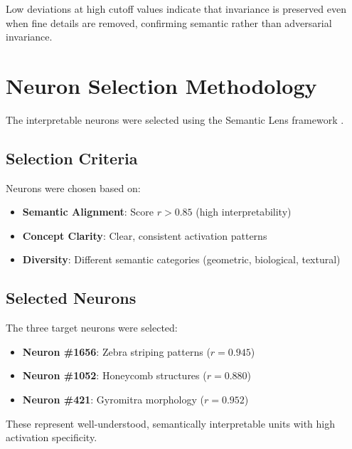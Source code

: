 \documentclass[licencjacka,en]{pracamgr}
\begin{document}
Low deviations at high cutoff values indicate that invariance is preserved even when fine details are removed, confirming semantic rather than adversarial invariance.

\section{Neuron Selection Methodology}\label{appendix:neuron_selection}

The interpretable neurons were selected using the Semantic Lens framework \citep{dreyer2025mechanisticunderstandingvalidationlarge}.

\subsection{Selection Criteria}

Neurons were chosen based on:
\begin{itemize}
\item \textbf{Semantic Alignment}: Score $r > 0.85$ (high interpretability)
\item \textbf{Concept Clarity}: Clear, consistent activation patterns
\item \textbf{Diversity}: Different semantic categories (geometric, biological, textural)
\end{itemize}

\subsection{Selected Neurons}

The three target neurons were selected:
\begin{itemize}
\item \textbf{Neuron \#1656}: Zebra striping patterns ($r = 0.945$)
\item \textbf{Neuron \#1052}: Honeycomb structures ($r = 0.880$)
\item \textbf{Neuron \#421}: Gyromitra morphology ($r = 0.952$)
\end{itemize}

These represent well-understood, semantically interpretable units with high activation specificity.


\end{document}
